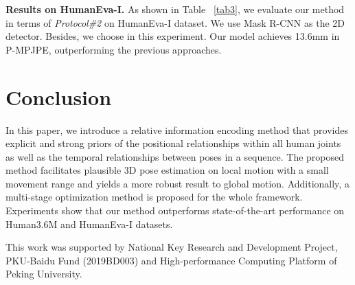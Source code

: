 \documentclass[sigconf]{acmart}
\begin{document}
\textbf{Results on HumanEva-I.} As shown in Table ~\ref{tab3}, we evaluate our method in terms of \textit{Protocol\#2} on HumanEva-I dataset. We use Mask R-CNN \cite{he2017mask} as the 2D detector. Besides, we choose  in this experiment. Our model achieves 13.6mm in P-MPJPE, outperforming the previous approaches.



\section{Conclusion}
In this paper, we introduce a relative information encoding method that provides explicit and strong priors of the positional relationships within all human joints as well as the temporal relationships between poses in a sequence. The proposed method facilitates plausible 3D pose estimation on local motion with a small movement range and yields a more robust result to global motion. Additionally, a multi-stage optimization method is proposed for the whole framework. Experiments show that our method outperforms state-of-the-art performance on Human3.6M and HumanEva-I datasets.

\begin{acks}
This work was supported by National Key Research and Development Project, PKU-Baidu Fund (2019BD003) and High-performance Computing Platform of Peking University.
\end{acks}
\end{document}

